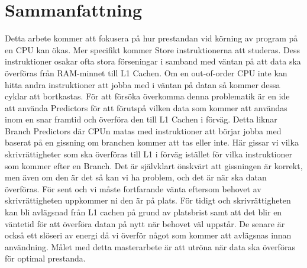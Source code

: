 \chapter*{Sammanfattning}
Detta arbete kommer att fokusera på hur prestandan vid körning av program på
en CPU kan ökas. Mer specifikt kommer Store instruktionerna att studeras. Dess
instruktioner osakar ofta stora förseningar i samband med väntan på att data ska
överföras från RAM-minnet till L1 Cachen. Om en out-of-order CPU inte kan hitta
andra instruktioner att jobba med i väntan på datan så kommer dessa cyklar att
bortkastas. För att försöka överkomma denna problematik är en ide att använda
Predictors för att förutspå vilken data som kommer att användas inom en snar framtid
och överföra den till L1 Cachen i förväg. Detta liknar Branch Predictors där CPUn
matas med instruktioner att börjar jobba med baserat på en gissning om branchen
kommer att tas eller inte. Här gissar vi vilka skrivrättigheter som ska överföras till L1 i förväg
istället för vilka instruktioner som kommer efter en Branch. Det är självklart önskvärt
att gissningen är korrekt, men även om den är det så kan vi ha problem, och det är
när ska datan överföras. För sent och vi måste fortfarande vänta eftersom behovet
av skrivrättigheten uppkommer ni den är på plats. För tidigt och skrivrättigheten kan bli avlägsnad från L1
cachen på grund av platsbrist samt att det blir en väntetid för att överföra datan på
nytt när behovet väl uppstår. De senare är också ett slöseri av energi då vi överför
något som kommer att avlägsnas innan användning. Målet med detta masterarbete
är att utröna när data ska överföras för optimal prestanda.
\newpage